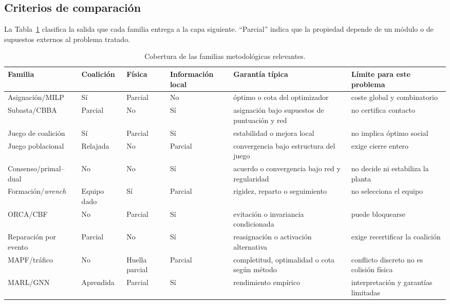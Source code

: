 \subsection{Criterios de comparación}
\label{subsec:method-comparison}

La Tabla~\ref{tab:tf-comparison} clasifica la salida que cada familia entrega a
la capa siguiente. ``Parcial'' indica que la propiedad depende de un módulo o
de supuestos externos al problema tratado.

\begin{table}[!htbp]
  \centering
  \caption{Cobertura de las familias metodológicas relevantes.}
  \label{tab:tf-comparison}
  \scriptsize
  \setlength{\tabcolsep}{2.4pt}
  \begin{tabularx}{\textwidth}{@{}p{2.0cm}p{1.25cm}p{1.35cm}p{1.45cm}X p{2.2cm}@{}}
    \toprule
    Familia & Coalición & Física & Información local & Garantía típica & Límite para este problema \\
    \midrule
    Asignación/MILP & Sí & Parcial & No & óptimo o cota del optimizador & coste global y combinatorio \\
    Subasta/CBBA & Parcial & No & Sí & asignación bajo supuestos de puntuación y red & no certifica contacto \\
    Juego de coalición & Sí & Parcial & Sí & estabilidad o mejora local & no implica óptimo social \\
    Juego poblacional & Relajada & No & Parcial & convergencia bajo estructura del juego & exige cierre entero \\
    Consenso/primal--dual & No & No & Sí & acuerdo o convergencia bajo red y regularidad & no decide ni estabiliza la planta \\
    Formación/\emph{wrench} & Equipo dado & Sí & Parcial & rigidez, reparto o seguimiento & no selecciona el equipo \\
    ORCA/CBF & No & Parcial & Sí & evitación o invariancia condicionada & puede bloquearse \\
    Reparación por evento & Parcial & No & Sí & reasignación o activación alternativa & exige recertificar la coalición \\
    MAPF/tráfico & No & Huella parcial & Parcial & completitud, optimalidad o cota según método & conflicto discreto no es colisión física \\
    MARL/GNN & Aprendida & Parcial & Sí & rendimiento empírico & interpretación y garantías limitadas \\
    \bottomrule
  \end{tabularx}
  \viuownsource
\end{table}


